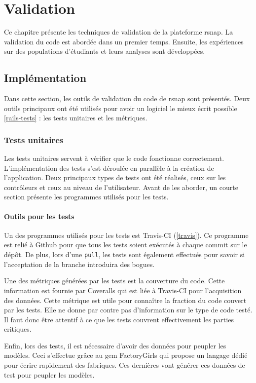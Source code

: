 \chapter{Validation}
Ce chapitre présente les techniques de validation de la plateforme \gls{rsnap}. La validation du code est abordée dans un premier temps. Ensuite, les expériences sur des populations d'étudiants et leurs analyses sont développées.

\section{Implémentation}
Dans cette section, les outils de validation du code de \gls{rsnap} sont présentés. Deux outils principaux ont été utilisés pour avoir un logiciel le mieux écrit possible \ref{rails-tests} : les tests unitaires et les métriques.

\subsection{Tests unitaires}
Les tests unitaires servent à vérifier que le code fonctionne correctement. L'implémentation des tests s'est déroulée en parallèle à la création de l'application. Deux principaux types de tests ont été réalisés, ceux sur les contrôleurs et ceux au niveau de l'utilisateur. Avant de les aborder, un courte section présente les programmes utilisés pour les tests.

\subsubsection{Outils pour les tests}
Un des programmes utilisés pour les tests est Travis-CI (\ref{travis}). Ce programme est relié à Github pour que tous les tests soient exécutés à chaque commit sur le dépôt. De plus, lors d'une \texttt{\gls{pull}}, les tests sont également effectués pour savoir si l'acceptation de la branche introduira des bogues.

Une des métriques générées par les tests est la couverture du code. Cette information est fournie par Coveralls\cite{coveralls} qui est liée à Travis-CI pour l'acquisition des données. Cette métrique est utile pour connaître la fraction du code couvert par les tests. Elle ne donne par contre pas d'information sur le type de code testé. Il faut donc être attentif à ce que les tests couvrent effectivement les parties critiques.

Enfin, lors des tests, il est nécessaire d'avoir des données pour peupler les modèles. Ceci s'effectue grâce au \gls{gem} FactoryGirls \cite{factorygirls} qui propose un langage dédié pour écrire rapidement des fabriques. Ces dernières vont générer ces données de test pour peupler les modèles.

